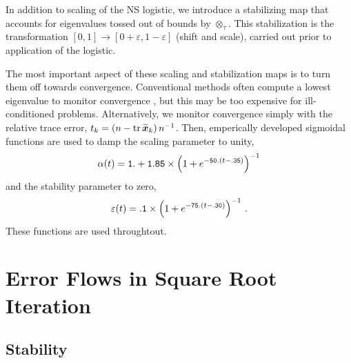 \documentclass[letterpaper,twocolumn,amsmath,amsfont,amssymb,english,aps,jcp,preprintnumbers,groupaddress,nofootinbib,tightenlines,floatfix]{revtex4}
\newcommand{\mat}[1]{\boldsymbol{#1}}
\newcommand{\ot}{  {\scriptstyle \otimes}_{ \tau } }
\theoremstyle{plain}
\theoremstyle{remark}
\theoremstyle{plain}
\begin{document}
In addition to scaling of the NS logistic, we introduce a stabilizing map that accounts for eigenvalues 
tossed out of bounds by $\ot$. This stabilization is the transformation $[0,1] \rightarrow [0+\varepsilon, 1-\varepsilon]$
(shift and scale), carried out prior to application of the logistic.   

The most important aspect of these scaling and stabilization maps is to turn them off towards convergence.  Conventional methods 
often compute a lowest eigenvalue to monitor convergence \cite{Pan1991,Chen2014}, but this may be too expensive for ill-conditioned problems. 
Alternatively, we monitor convergence simply with the relative trace error, 
$t_k = \left( n - {\rm tr} \, \widetilde{\mat{x}}_k \right) n^{-1}$.  
Then, emperically developed sigmoidal functions are used to damp the scaling parameter to unity, 
\begin{equation}
\alpha(t) = {\tt 1.} + {\tt 1.85}  \times \left( 1+e^{-{\tt 50.}(t-{\tt .35})}  \right)^{-1} 
\end{equation}
and the stability parameter to zero, 
\begin{equation}
\varepsilon(t) = {\tt .1} \times \left( 1+e^{-{\tt 75.}(t-{\tt .30})}  \right)^{-1} \, .
\end{equation}
These functions are used throughtout. 

\section{Error Flows in Square Root Iteration}

\subsection{Stability}

\end{document}
